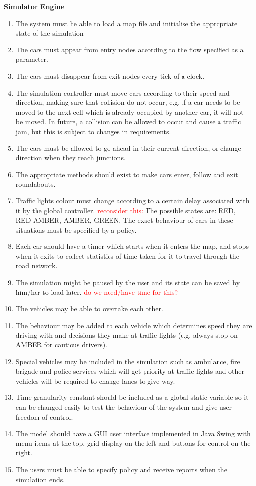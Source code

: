\documentclass{article}
\begin{document}
\noindent
{\bf Simulator Engine}
\begin{enumerate}
	
	\item  The system must be able to load a map file and initialise the appropriate state of the simulation 
	
	\item The cars must appear from entry nodes according to the flow specified as a parameter.
	\item The cars must disappear from exit nodes every tick of a clock.
	\item The simulation controller must move cars according to their speed and direction, making sure that collision do not occur, e.g. if a car needs to be moved to the next cell which is already occupied by another car, it will not be moved. In future, a collision can be allowed to occur and cause a traffic jam, but this is subject to changes in requirements.
	\item The cars must be allowed to go ahead in their current direction, or change direction when they reach junctions. 
	\item The appropriate methods should exist to make cars enter, follow and exit roundabouts.
	\item Traffic lights colour must change according to a certain delay associated with it by the global controller. \textcolor{red}{reconsider this:} The possible states are: RED, RED-AMBER, AMBER, GREEN. The exact behaviour of cars in these situations must be specified by a policy.
	\item Each car should have a timer which starts when it enters the map, and stops when it exits to collect statistics of time taken for it to travel through the road network.
	\item  The simulation might be paused by the user and its state can be saved by him/her to load later. \textcolor{red}{do we need/have time for this?}
	\item The vehicles may be able to overtake each other. 
	\item  The behaviour may be added to each vehicle which determines speed they are driving with and decisions they make at traffic lights (e.g. always stop on AMBER for cautious drivers).
	\item Special vehicles may be included in the simulation such as ambulance, fire brigade and police services which will get priority at traffic lights and other vehicles will be required to change lanes to give way. 
	\item Time-granularity constant should be included as a global static variable so it can be changed easily to test the behaviour of the system and give user freedom of control. 
	\item The model should have a GUI user interface implemented in Java Swing with menu items at the top, grid display on the left and buttons for control on the right. 
	\item The users must be able to specify policy and receive reports when the simulation ends.  
	
\end{enumerate}
\end{document}

